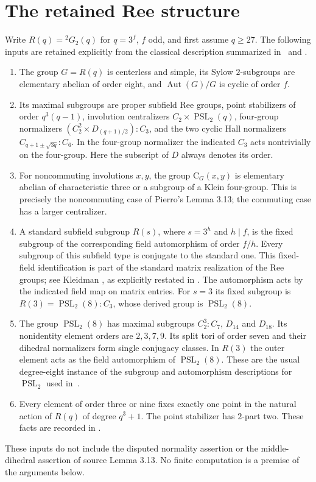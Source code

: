 \documentclass[11pt,a4paper]{article}
\newcommand{\Cent}{\mathrm C}
\newcommand{\Aut}{\operatorname{Aut}}
\begin{document}
\section{The retained Ree structure}
Write $R(q)={}^2G_2(q)$ for $q=3^f$, $f$ odd, and first assume $q\ge27$.
The following inputs are retained explicitly from the classical
description summarized in~\cite[Section 2.2]{LSV} and
\cite[Section 2 and Lemma 3.13]{Pierro}.
\begin{enumerate}
\item The group $G=R(q)$ is centerless and simple, its Sylow
$2$-subgroups are elementary abelian of order eight, and
$\Aut(G)/G$ is cyclic of order $f$.
\item Its maximal subgroups are proper subfield Ree groups,
point stabilizers of order $q^3(q-1)$, involution centralizers
$C_2\times\operatorname{PSL}_2(q)$, four-group normalizers
$(C_2^2\times D_{(q+1)/2}):C_3$, and the two cyclic Hall normalizers
$C_{q+1\pm\sqrt{3q}}:C_6$. In the four-group normalizer the indicated
$C_3$ acts nontrivially on the four-group. Here the subscript of $D$
always denotes its order.
\item For noncommuting involutions $x,y$, the group $\Cent_G(x,y)$
is elementary abelian of characteristic three or a subgroup of a
Klein four-group. This is precisely the noncommuting case of
Pierro's Lemma 3.13; the commuting case has a larger centralizer.
\item A standard subfield subgroup $R(s)$, where $s=3^h$ and $h\mid f$,
is the fixed subgroup of the corresponding field automorphism of
order $f/h$. Every subgroup of this subfield type is conjugate to
the standard one. This fixed-field identification is part of the
standard matrix realization of the Ree groups; see Kleidman
\cite[Lemma 6.2]{Kleidman}, as explicitly restated in
\cite[Section 6, p.~7]{Nagy}. The automorphism acts by the indicated
field map on matrix entries. For $s=3$ its fixed
subgroup is $R(3)=\operatorname{PSL}_2(8):C_3$, whose derived group is
$\operatorname{PSL}_2(8)$.
\item The group $\operatorname{PSL}_2(8)$ has maximal subgroups
$C_2^3:C_7$, $D_{14}$ and $D_{18}$. Its nonidentity element orders
are $2,3,7,9$. Its split tori of order seven and their dihedral
normalizers form single conjugacy classes. In $R(3)$ the outer
element acts as the field automorphism of $\operatorname{PSL}_2(8)$.
These are the usual degree-eight instance of the subgroup and
automorphism descriptions for $\operatorname{PSL}_2$ used in~\cite{LSV}.
\item Every element of order three or nine fixes exactly one point
in the natural action of $R(q)$ of degree $q^3+1$. The point
stabilizer has $2$-part two. These facts are recorded in
\cite[Tables 1 and 3]{Pierro}.
\end{enumerate}
These inputs do not include the disputed normality assertion or the
middle-dihedral assertion of source Lemma 3.13. No finite computation
is a premise of the arguments below.
\end{document}
